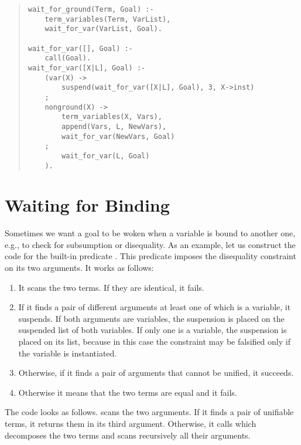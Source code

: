 \begin{quote}
\begin{verbatim}
wait_for_ground(Term, Goal) :-
    term_variables(Term, VarList),
    wait_for_var(VarList, Goal).

wait_for_var([], Goal) :-
    call(Goal).
wait_for_var([X|L], Goal) :-
    (var(X) ->
        suspend(wait_for_var([X|L], Goal), 3, X->inst)
    ;
    nonground(X) ->
        term_variables(X, Vars),
        append(Vars, L, NewVars),
        wait_for_var(NewVars, Goal)
    ;
        wait_for_var(L, Goal)
    ).
\end{verbatim}
\end{quote}


\section{Waiting for Binding}
Sometimes we want a goal to be woken when a variable is bound
to another one, e.g., to check for
subsumption or disequality.
As an example, let us construct the code for the built-in predicate
.
This predicate imposes the disequality constraint on its two arguments.
It works as follows:
\begin{enumerate}
\item It scans the two terms.
If they are identical, it fails.

\item If it finds a pair of different arguments at least one of which is a
variable, it suspends. If both arguments are variables,
the suspension is placed on the  suspended list
of both variables.
If only one is a variable, the suspension is placed on its 
list, because in this case the constraint may be falsified
only if the variable is instantiated.

\item Otherwise, if it finds a pair of arguments that cannot be unified,
it succeeds.

\item Otherwise it means that the two terms are equal and it fails.
\end{enumerate}

The code looks as follows.  scans the two
arguments.
If it finds a pair of unifiable terms, it returns them in
its third argument.
Otherwise, it calls  which decomposes
the two terms and scans recursively all their arguments.

